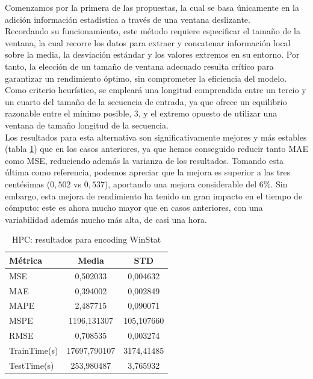 Comenzamos por la primera de las propuestas, la cual se basa únicamente en la adición información estadística a través de una ventana deslizante.\\

Recordando su funcionamiento, este método requiere especificar el tamaño de la ventana, la cual recorre los datos para extraer y concatenar información local sobre la media, la desviación estándar y los valores extremos en su entorno. Por tanto, la elección de un tamaño de ventana adecuado resulta crítico para garantizar un rendimiento óptimo, sin comprometer la eficiencia del modelo. Como criterio heurístico, se empleará una longitud comprendida entre un tercio y un cuarto del tamaño de la secuencia de entrada, ya que ofrece un equilibrio razonable entre el mínimo posible, 3, y el extremo opuesto de utilizar una ventana de tamaño longitud de la secuencia.\\

Los resultados para esta alternativa son significativamente mejores y más estables (tabla \ref{hpcwin}) que en los casos anteriores, ya que hemos conseguido reducir tanto MAE como MSE, reduciendo además la varianza de los resultados. Tomando esta última como referencia, podemos apreciar que la mejora es superior a las tres centésimas ($0,502$ vs $0,537$), aportando una mejora considerable del 6\%. Sin embargo, esta mejora de rendimiento ha tenido un gran impacto en el tiempo de cómputo: este es ahora mucho mayor que en casos anteriores, con una variabilidad además mucho más alta, de casi una hora.\\

\begin{table}[!ht]
	\centering
	\begin{tabular}{l|c|c}
		\toprule
		Métrica & Media & STD \\
		\midrule
		MSE & 0,502033 & 0,004632 \\
		MAE & 0,394002 & 0,002849 \\
		MAPE & 2,487715 & 0,090071 \\
		MSPE & 1196,131307 & 105,107660 \\
		RMSE & 0,708535 & 0,003274 \\
		TrainTime(s) & 17697,790107 & 3174,41485 \\
		TestTime(s) & 253,980487 & 3,765932 \\
		\bottomrule
	\end{tabular}
	\caption{HPC: resultados para encoding WinStat}
	\label{hpcwin}
\end{table}

